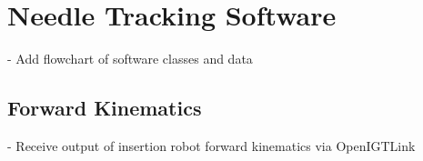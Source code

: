 \section{Needle Tracking Software}
- Add flowchart of software classes and data





\subsection{Forward Kinematics}
- Receive output of insertion robot forward kinematics via OpenIGTLink

